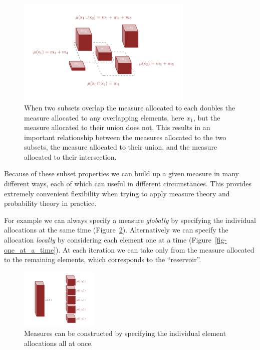 \documentclass[
  letterpaper,
  DIV=11,
  numbers=noendperiod]{scrartcl}
\begin{document}
\begin{figure}

{\centering \includegraphics[width=0.75\textwidth,height=\textheight]{figures/overlapping_subsets_measures/overlapping_subsets_measures.pdf}

}

\caption{\label{fig-overlapping_subsets_measures}When two subsets
overlap the measure allocated to each doubles the measure allocated to
any overlapping elements, here \(x_{1}\), but the measure allocated to
their union does not. This results in an important relationship between
the measures allocated to the two subsets, the measure allocated to
their union, and the measure allocated to their intersection.}

\end{figure}

Because of these subset properties we can build up a given measure in
many different ways, each of which can useful in different
circumstances. This provides extremely convenient flexibility when
trying to apply measure theory and probability theory in practice.

For example we can always specify a measure \emph{globally} by
specifying the individual allocations at the same time
(Figure~\ref{fig-all_at_once}). Alternatively we can specify the
allocation \emph{locally} by considering each element one at a time
(Figure~\ref{fig-one_at_a_time}). At each iteration we can take only
from the measure allocated to the remaining elements, which corresponds
to the ``reservoir''.

\begin{figure}

{\centering \includegraphics[width=0.33\textwidth,height=\textheight]{figures/decompositions/all_at_once/all_at_once.pdf}

}

\caption{\label{fig-all_at_once}Measures can be constructed by
specifying the individual element allocations all at once.}

\end{figure}
\end{document}
